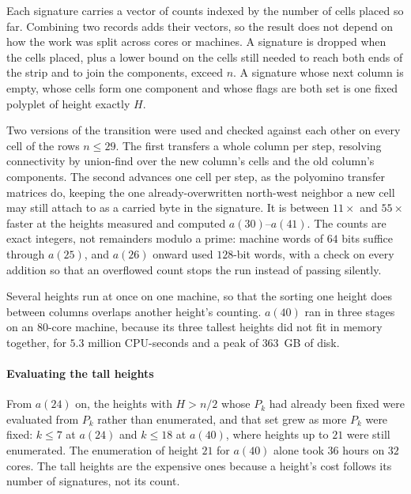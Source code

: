 \documentclass[11pt]{article}
\begin{document}
Each signature carries a vector of counts indexed by the number of cells
placed so far. Combining two records adds their vectors, so the result does
not depend on how the work was split across cores or machines. A signature is
dropped when the cells placed, plus a lower bound on the cells still needed
to reach both ends of the strip and to join the components, exceed $n$. A
signature whose next column is empty, whose cells form one component and
whose flags are both set is one fixed polyplet of height exactly $H$.

Two versions of the transition were used and checked against each other on
every cell of the rows $n \le 29$. The first transfers a whole column per
step, resolving connectivity by union-find over the new column's cells and
the old column's components. The second advances one cell per step, as the
polyomino transfer matrices do, keeping the one already-overwritten
north-west neighbor a new cell may still attach to as a carried byte in the
signature. It is between $11\times$ and $55\times$ faster at the heights
measured and computed $a(30)$--$a(41)$. The counts are exact integers, not
remainders modulo a prime: machine words of $64$ bits suffice through $a(25)$, and
$a(26)$ onward used $128$-bit words, with a check on every addition so that
an overflowed count stops the run instead of passing silently.

Several heights run at once on one machine, so that the sorting one height
does between columns overlaps another height's counting. $a(40)$ ran in three
stages on an $80$-core machine, because its three tallest heights did not fit
in memory together, for $5.3$ million CPU-seconds and a peak of $363$~GB of
disk.

\paragraph{Evaluating the tall heights} From $a(24)$ on, the heights with
$H > n/2$ whose $P_k$ had already been fixed were evaluated from $P_k$ rather
than enumerated, and that set grew as more $P_k$ were fixed: $k \le 7$ at $a(24)$
and $k \le 18$ at $a(40)$, where heights up to $21$ were still enumerated.
The enumeration of height $21$ for $a(40)$ alone took $36$ hours on $32$
cores. The tall heights are the expensive ones because a height's cost
follows its number of signatures, not its count.
\end{document}
